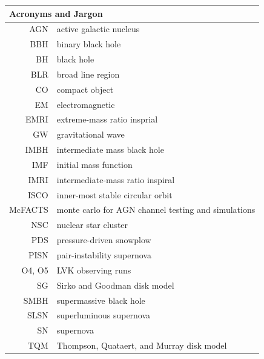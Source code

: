 \begin{tabular}{rl}
\\
\multicolumn{2}{l}{\textbf{Acronyms and Jargon}} \\
\hline
AGN & active galactic nucleus \\
BBH & binary black hole \\
BH & black hole \\
BLR & broad line region \\
CO & compact object \\
EM & electromagnetic \\
EMRI & extreme-mass ratio insprial \\
GW & gravitational wave \\
IMBH & intermediate mass black hole \\
IMF & initial mass function \\
IMRI & intermediate-mass ratio inspiral \\
ISCO & inner-most stable circular orbit \\
McFACTS & monte carlo for AGN channel testing and simulations \\
NSC & nuclear star cluster \\
PDS & pressure-driven snowplow \\
PISN & pair-instability supernova \\
O4, O5 & LVK observing runs \\
SG & Sirko and Goodman disk model \\
SMBH & supermassive black hole \\
SLSN & superluminous supernova \\
SN & supernova \\
TQM & Thompson, Quataert, and Murray disk model \\
\end{tabular}

